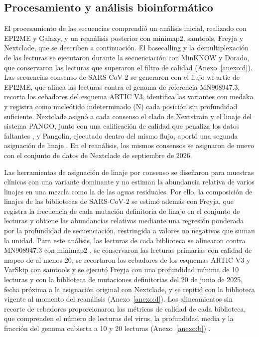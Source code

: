 \subsection{Procesamiento y análisis bioinformático}

El procesamiento de las secuencias comprendió un análisis inicial, realizado con EPI2ME y Galaxy, y un reanálisis posterior con minimap2, samtools, Freyja y Nextclade, que se describen a continuación. El basecalling y la demultiplexación de las lecturas se ejecutaron durante la secuenciación con MinKNOW y Dorado, que conservaron las lecturas que superaron el filtro de calidad (Anexo~\ref{anexo:d}). Las secuencias consenso de SARS-CoV-2 se generaron con el flujo wf-artic de EPI2ME, que alinea las lecturas contra el genoma de referencia MN908947.3, recorta los cebadores del esquema ARTIC V3, identifica las variantes con medaka y registra como nucleótido indeterminado (N) cada posición sin profundidad suficiente. Nextclade asignó a cada consenso el clado de Nextstrain y el linaje del sistema PANGO, junto con una calificación de calidad que penaliza los datos faltantes \cite{Aksamentov_2021}, y Pangolin, ejecutado dentro del mismo flujo, aportó una segunda asignación de linaje \cite{OToole_2021}. En el reanálisis, los mismos consensos se asignaron de nuevo con el conjunto de datos de Nextclade de septiembre de 2026.

Las herramientas de asignación de linaje por consenso se diseñaron para muestras clínicas con una variante dominante y no estiman la abundancia relativa de varios linajes en una mezcla como la de las aguas residuales. Por ello, la composición de linajes de las bibliotecas de SARS-CoV-2 se estimó además con Freyja, que registra la frecuencia de cada mutación definitoria de linaje en el conjunto de lecturas y obtiene las abundancias relativas mediante una regresión ponderada por la profundidad de secuenciación, restringida a valores no negativos que suman la unidad. Para este análisis, las lecturas de cada biblioteca se alinearon contra MN908947.3 con minimap2 \cite{Li_2018}, se conservaron las lecturas primarias con calidad de mapeo de al menos 20, se recortaron los cebadores de los esquemas ARTIC V3 y VarSkip con samtools \cite{Danecek_2021} y se ejecutó Freyja con una profundidad mínima de 10 lecturas y con la biblioteca de mutaciones definitorias del 20 de junio de 2025, fecha próxima a la asignación original con Nextclade, y se repitió con la biblioteca vigente al momento del reanálisis (Anexo~\ref{anexo:d}). Los alineamientos sin recorte de cebadores proporcionaron las métricas de calidad de cada biblioteca, que comprenden el número de lecturas del virus, la profundidad media y la fracción del genoma cubierta a 10 y 20 lecturas (Anexo~\ref{anexo:b}) \cite{Karthikeyan_2022}.


